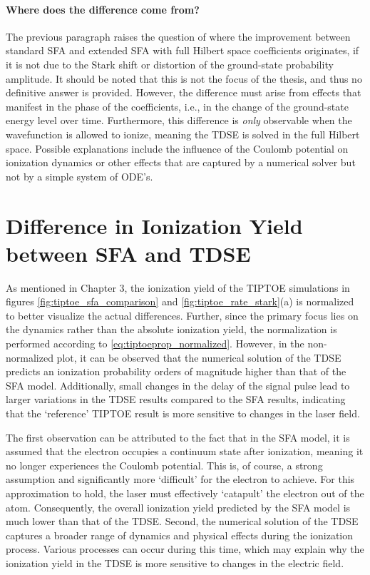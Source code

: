 \paragraph{Where does the difference come from?}
The previous paragraph raises the question of where the improvement between standard SFA and extended SFA with full Hilbert space coefficients originates, if it is not due to the Stark shift or distortion of the ground-state probability amplitude.
It should be noted that this is not the focus of the thesis, and thus no definitive answer is provided.
However, the difference must arise from effects that manifest in the phase of the coefficients, i.e., in the change of the ground-state energy level over time. Furthermore, this difference is \emph{only} observable when the wavefunction is allowed to ionize, meaning the TDSE is solved in the full Hilbert space.
Possible explanations include the influence of the Coulomb potential on ionization dynamics or other effects that are captured by a numerical solver but not by a simple system of ODE's.

\section{Difference in Ionization Yield between SFA and TDSE}
\label{sec:diff_ion_SFA_tRecX}
As mentioned in Chapter 3, the ionization yield of the TIPTOE simulations in figures \ref{fig:tiptoe_sfa_comparison} and \ref{fig:tiptoe_rate_stark}(a) is normalized to better visualize the actual differences.
Further, since the primary focus lies on the dynamics rather than the absolute ionization yield, the normalization is performed according to \eqref{eq:tiptoeprop_normalized}.
However, in the non-normalized plot, it can be observed that the numerical solution of the TDSE predicts an ionization probability orders of magnitude higher than that of the SFA model.
Additionally, small changes in the delay of the signal pulse lead to larger variations in the TDSE results compared to the SFA results, indicating that the `reference' TIPTOE result is more sensitive to changes in the laser field.

The first observation can be attributed to the fact that in the SFA model, it is assumed that the electron occupies a continuum state after ionization, meaning it no longer experiences the Coulomb potential.
This is, of course, a strong assumption and significantly more `difficult' for the electron to achieve.
For this approximation to hold, the laser must effectively `catapult' the electron out of the atom.
Consequently, the overall ionization yield predicted by the SFA model is much lower than that of the TDSE.
Second, the numerical solution of the TDSE captures a broader range of dynamics and physical effects during the ionization process.
Various processes can occur during this time, which may explain why the ionization yield in the TDSE is more sensitive to changes in the electric field.

